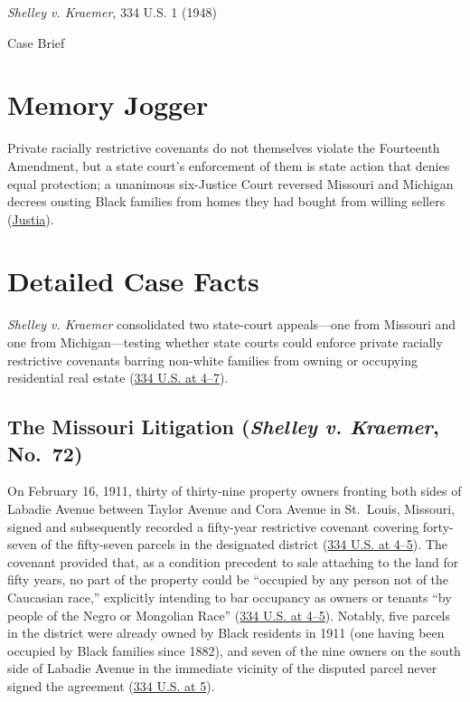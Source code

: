 \documentclass[12pt]{article}
\begin{document}
\begin{center}
{\LARGE \textit{Shelley v. Kraemer}, 334 U.S. 1 (1948)\par}
\vspace{0.8em}
{\large Case Brief\par}
\end{center}
\vspace{1em}

\section{Memory Jogger}
Private racially restrictive covenants do not themselves violate the Fourteenth Amendment, but a state court's enforcement of them is state action that denies equal protection; a unanimous six-Justice Court reversed Missouri and Michigan decrees ousting Black families from homes they had bought from willing sellers (\href{https://supreme.justia.com/cases/federal/us/334/1/}{Justia}).

\section{Detailed Case Facts}
\textit{Shelley v. Kraemer} consolidated two state-court appeals---one from Missouri and one from Michigan---testing whether state courts could enforce private racially restrictive covenants barring non-white families from owning or occupying residential real estate (\href{https://supreme.justia.com/cases/federal/us/334/1/}{334 U.S. at 4--7}).

\subsection{The Missouri Litigation (\textit{Shelley v. Kraemer}, No.~72)}
On February 16, 1911, thirty of thirty-nine property owners fronting both sides of Labadie Avenue between Taylor Avenue and Cora Avenue in St.~Louis, Missouri, signed and subsequently recorded a fifty-year restrictive covenant covering forty-seven of the fifty-seven parcels in the designated district (\href{https://supreme.justia.com/cases/federal/us/334/1/}{334 U.S. at 4--5}). The covenant provided that, as a condition precedent to sale attaching to the land for fifty years, no part of the property could be ``occupied by any person not of the Caucasian race,'' explicitly intending to bar occupancy as owners or tenants ``by people of the Negro or Mongolian Race'' (\href{https://supreme.justia.com/cases/federal/us/334/1/}{334 U.S. at 4--5}). Notably, five parcels in the district were already owned by Black residents in 1911 (one having been occupied by Black families since 1882), and seven of the nine owners on the south side of Labadie Avenue in the immediate vicinity of the disputed parcel never signed the agreement (\href{https://supreme.justia.com/cases/federal/us/334/1/}{334 U.S. at 5}).
\end{document}

